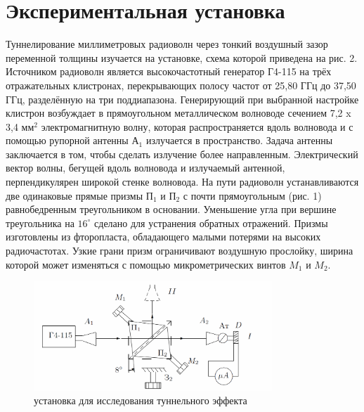 \documentclass[12pt]{article}
\begin{document}
\section{Экспериментальная установка}
Туннелирование миллиметровых радиоволн через тонкий воздушный зазор переменной толщины изучается на установке, схема которой приведена на рис. 2. Источником радиоволн является высокочастотный генератор Г4-115 на трёх отражательных клистронах, перекрывающих полосу частот от 25,80 ГГц до 37,50 ГГц, разделённую на три поддиапазона. Генерирующий при выбранной настройке клистрон возбуждает в прямоугольном металлическом волноводе сечением 7,2 x 3,4 $мм^2$ электромагнитную волну, которая распространяется вдоль волновода и с помощью рупорной антенны $А_1$ излучается в пространство. Задача антенны заключается в том, чтобы сделать излучение более направленным. Электрический вектор волны, бегущей вдоль волновода и излучаемый антенной, перпендикулярен широкой стенке волновода. На пути радиоволн устанавливаются две одинаковые прямые призмы $П_1$ и $П_2$ с почти прямоугольным (рис. 1) равнобедренным треугольником в основании. Уменьшение угла при вершине треугольника на $16^\circ$ сделано для устранения обратных отражений. Призмы изготовлены из фторопласта, обладающего малыми потерями на высоких радиочастотах. Узкие грани призм ограничивают воздушную прослойку, ширина которой может изменяться с помощью микрометрических винтов $M_1$ и $M_2$.
\begin{figure}
\begin{center}
\includegraphics[width=0.8\textwidth]{tunnelteor}
\caption{установка для исследования туннельного эффекта}
\end{center}

\end{figure}
\end{document}

